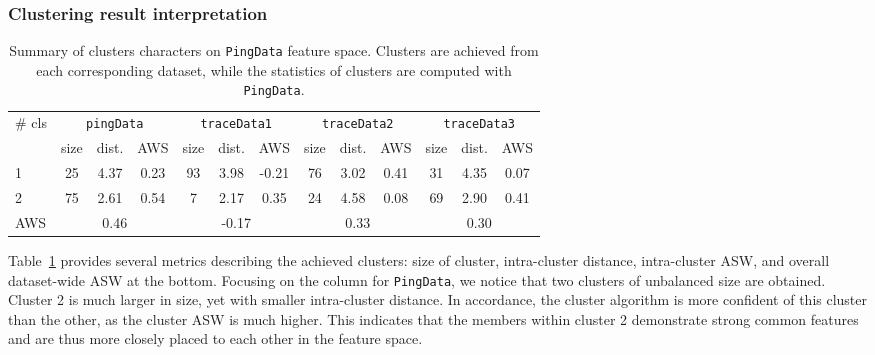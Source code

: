 \subsubsection{Clustering result interpretation}

\begin{table}[!htb]
\centering
\footnotesize
\setlength{\tabcolsep}{0.5em}
\begin{tabular}{l|ccc|ccc|ccc|ccc}
\toprule
\multirow{2}{*}{\# cls} & \multicolumn{3}{c|}{\texttt{pingData}} & \multicolumn{3}{c|}{\texttt{traceData1}} & \multicolumn{3}{c|}{\texttt{traceData2}} & \multicolumn{3}{c}{\texttt{traceData3}}\\
& size & dist. & AWS & size & dist. & AWS & size & dist. & AWS & size& dist. & AWS\\
\midrule
1 & 25 & 4.37 & 0.23 & 93 & 3.98 & -0.21 & 76 & 3.02 & 0.41 & 31 & 4.35 & 0.07\\
2 & 75 & 2.61 & 0.54 & 7  & 2.17 & 0.35  & 24 & 4.58 & 0.08 & 69 & 2.90 & 0.41\\ 
\midrule
AWS &\multicolumn{3}{c|}{0.46} & \multicolumn{3}{c|}{-0.17} & \multicolumn{3}{c|}{0.33} & \multicolumn{3}{c}{0.30}\\
\bottomrule
\end{tabular}
\caption{Summary of clusters characters on \texttt{PingData} feature space. Clusters are achieved from each corresponding dataset, while the statistics of clusters are computed with \texttt{PingData}.}
\label{tab:summary_cls}
\end{table}

Table~\ref{tab:summary_cls} provides several metrics describing the achieved clusters: size of cluster, intra-cluster distance, intra-cluster \ac{ASW}, and overall dataset-wide \ac{ASW} at the bottom.
Focusing on the column for \texttt{PingData}, we notice that two clusters of unbalanced size are obtained.
Cluster 2 is much larger in size, yet with smaller intra-cluster distance. 
In accordance, the cluster algorithm is more confident of this cluster than the other, as the cluster \ac{ASW} is much higher.
This indicates that the members within cluster 2 demonstrate strong common features and are thus more closely placed to each other in the feature space.

